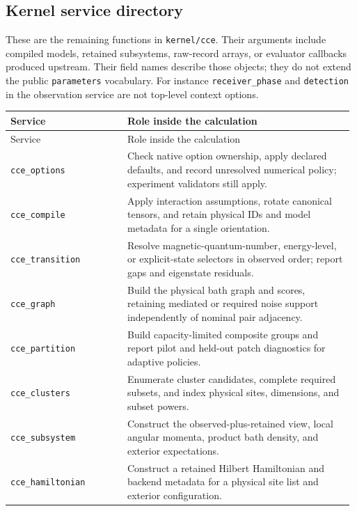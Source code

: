\documentclass[11pt,a4paper]{article}
\newcommand{\code}[1]{\texttt{#1}}
\begin{document}
\subsection{Kernel service directory}
These are the remaining functions in \code{kernel/cce}. Their arguments include compiled models, retained subsystems, raw-record arrays, or evaluator callbacks produced upstream. Their field names describe those objects; they do not extend the public \code{parameters} vocabulary. For instance \code{receiver\_phase} and \code{detection} in the observation service are not top-level context options.

\begingroup\small
\begin{longtable}{@{}>{\raggedright\arraybackslash}p{0.335\linewidth}@{\hspace{0.025\linewidth}}>{\raggedright\arraybackslash}p{0.64\linewidth}@{}}
\toprule
Service & Role inside the calculation\\
\midrule\endfirsthead
\toprule
Service & Role inside the calculation\\
\midrule\endhead
\midrule\endfoot
\bottomrule\endlastfoot
\code{cce\_options} & Check native option ownership, apply declared defaults, and record unresolved numerical policy; experiment validators still apply.\\
\code{cce\_compile} & Apply interaction assumptions, rotate canonical tensors, and retain physical IDs and model metadata for a single orientation.\\
\code{cce\_transition} & Resolve magnetic-quantum-number, energy-level, or explicit-state selectors in observed order; report gaps and eigenstate residuals.\\
\code{cce\_graph} & Build the physical bath graph and scores, retaining mediated or required noise support independently of nominal pair adjacency.\\
\code{cce\_partition} & Build capacity-limited composite groups and report pilot and held-out patch diagnostics for adaptive policies.\\
\code{cce\_clusters} & Enumerate cluster candidates, complete required subsets, and index physical sites, dimensions, and subset powers.\\
\code{cce\_subsystem} & Construct the observed-plus-retained view, local angular momenta, product bath density, and exterior expectations.\\
\code{cce\_hamiltonian} & Construct a retained Hilbert Hamiltonian and backend metadata for a physical site list and exterior configuration.\\

\end{longtable}
\end{document}
